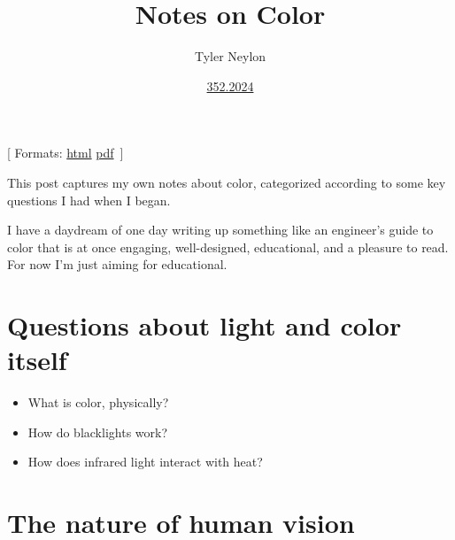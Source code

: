 \documentclass[
]{article}
\title{Notes on Color}
\author{Tyler Neylon}
\date{\href{https://tylerneylon.com/a/7date/}{352.2024}}
\providecommand{\tightlist}{%
  \setlength{\itemsep}{0pt}\setlength{\parskip}{0pt}}
\newcommand{\class}[1]{}
\newcommand{\optquad}{\quad}
\newcommand{\smallscrneg}{}
\newcommand{\smallscr}[1]{}
\newcommand{\bigscr}[1]{#1}
\newcommand{\smallscrskip}[1]{}
\begin{document}
\maketitle

\newcommand{\R}{\mathbb{R}}
\newcommand{\N}{\mathbb{N}}
\newcommand{\eqnset}[1]{\left.\mbox{$#1$}\;\;\right\rbrace\class{postbrace}{ }}
\providecommand{\latexonlyrule}[3][]{}
\providecommand{\optquad}{\class{optquad}{}}
\providecommand{\smallscrneg}{\class{smallscrneg}{ }}
\providecommand{\bigscr}[1]{\class{bigscr}{#1}}
\providecommand{\smallscr}[1]{\class{smallscr}{#1}}
\providecommand{\smallscrskip}[1]{\class{smallscrskip}{\hskip #1}}

\newcommand{\mydots}{{\cdot}\kern -0.1pt{\cdot}\kern -0.1pt{\cdot}}

\newcommand{\?}{\stackrel{?}{=}}
\newcommand{\sign}{\textsf{sign}}
\newcommand{\order}{\textsf{order}}
\newcommand{\flips}{\textsf{flips}}
\newcommand{\samecycles}{\textsf{same$\\\_$cycles}}
\newcommand{\canon}{\textsf{canon}}
\newcommand{\cs}{\mathsf{cs}}
\newcommand{\dist}{\mathsf{dist}}
\renewcommand{\theenumi}{(\roman{enumi})}

{[} Formats:
\href{http://tylerneylon.com/a/color_notes/color_notes.html}{html}
\textbar{}
\href{http://tylerneylon.com/a/color_notes/color_notes.pdf}{pdf}
\(\,\){]}

This post captures my own notes about color, categorized according to
some key questions I had when I began.

I have a daydream of one day writing up something like an engineer's
guide to color that is at once engaging, well-designed, educational, and
a pleasure to read. For now I'm just aiming for educational.

\hypertarget{questions-about-light-and-color-itself}{%
\section{Questions about light and color
itself}\label{questions-about-light-and-color-itself}}

\begin{itemize}
\tightlist
\item
  What is color, physically?
\item
  How do blacklights work?
\item
  How does infrared light interact with heat?
\end{itemize}

\hypertarget{the-nature-of-human-vision}{%
\section{The nature of human vision}\label{the-nature-of-human-vision}}
\end{document}
